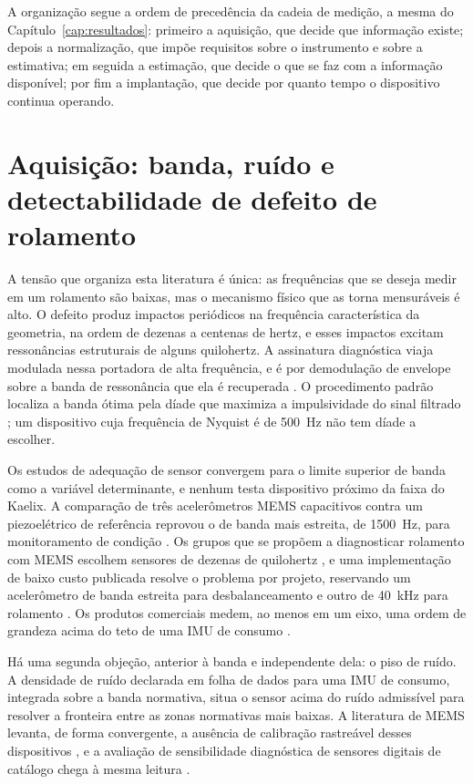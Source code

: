A organização segue a ordem de precedência da cadeia de medição, a mesma do
Capítulo~\ref{cap:resultados}: primeiro a aquisição, que decide que informação existe;
depois a normalização, que impõe requisitos sobre o instrumento e sobre a estimativa; em
seguida a estimação, que decide o que se faz com a informação disponível; por fim a
implantação, que decide por quanto tempo o dispositivo continua operando.

\section{Aquisição: banda, ruído e detectabilidade de defeito de rolamento}
\label{sec:rev-aquisicao}

A tensão que organiza esta literatura é única: as frequências que se deseja medir em um
rolamento são baixas, mas o mecanismo físico que as torna mensuráveis é alto. O defeito
produz impactos periódicos na frequência característica da geometria, na ordem de dezenas
a centenas de hertz, e esses impactos excitam ressonâncias estruturais de alguns
quilohertz. A assinatura diagnóstica viaja modulada nessa portadora de alta frequência, e é
por demodulação de envelope sobre a banda de ressonância que ela é recuperada
\cite{randall2011,antoni2006,antoni2007}. O procedimento padrão localiza a banda ótima pela
díade que maximiza a impulsividade do sinal filtrado \cite{antoni2007}; um dispositivo cuja
frequência de Nyquist é de \SI{500}{\hertz} não tem díade a escolher.

Os estudos de adequação de sensor convergem para o limite superior de banda como a variável
determinante, e nenhum testa dispositivo próximo da faixa do Kaelix. A comparação de três
acelerômetros MEMS capacitivos contra um piezoelétrico de referência reprovou o de banda
mais estreita, de \SI{1500}{\hertz}, para monitoramento de condição \cite{albarbar2008}.
Os grupos que se propõem a diagnosticar rolamento com MEMS escolhem sensores de dezenas de
quilohertz \cite{landi2023,sharma2024}, e uma implementação de baixo custo publicada
resolve o problema por projeto, reservando um acelerômetro de banda estreita para
desbalanceamento e outro de \SI{40}{\kilo\hertz} para rolamento \cite{jakobsen2024}. Os
produtos comerciais medem, ao menos em um eixo, uma ordem de grandeza acima do teto de uma
IMU de consumo \cite{bentlynevada2025,erbessd2025,tractian2022}.

Há uma segunda objeção, anterior à banda e independente dela: o piso de ruído. A densidade
de ruído declarada em folha de dados para uma IMU de consumo, integrada sobre a banda
normativa, situa o sensor acima do ruído admissível para resolver a fronteira entre as
zonas normativas mais baixas. A literatura de MEMS levanta, de forma convergente, a
ausência de calibração rastreável desses dispositivos \cite{albarbar2008,rodrigues2021},
e a avaliação de sensibilidade diagnóstica de sensores digitais de catálogo chega à mesma
leitura \cite{fidali2024}. 

